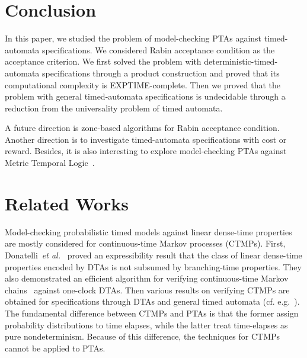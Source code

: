 \section{Conclusion}

In this paper, we studied the problem of model-checking PTAs against timed-automata specifications.
We considered Rabin acceptance condition as the acceptance criterion.
We first solved the problem with deterministic-timed-automata specifications through a product construction and proved that its computational complexity is EXPTIME-complete.
Then we proved that the problem with general timed-automata specifications is undecidable through a reduction from the universality problem of timed automata.

A future direction is zone-based algorithms for Rabin acceptance condition.
Another direction is to investigate timed-automata specifications with cost or reward.
Besides, it is also interesting to explore model-checking PTAs against Metric Temporal Logic~\cite{DBLP:journals/rts/Koymans90}. 

\section{Related Works}

Model-checking probabilistic timed models against linear dense-time properties
are mostly considered for continuous-time Markov processes (CTMPs).
First, Donatelli~\emph{et al.}~\cite{DBLP:journals/tse/DonatelliHS09} proved an expressibility result that the class of linear dense-time properties encoded by DTAs is not subsumed by branching-time properties.
They also demonstrated an efficient algorithm for verifying continuous-time Markov chains~\cite{DBLP:journals/tse/DonatelliHS09} against one-clock DTAs.
Then various results on verifying CTMPs are obtained for specifications through DTAs and general timed automata (cf. e.g.~\cite{DBLP:journals/tse/DonatelliHS09,DBLP:journals/corr/abs-1101-3694,DBLP:conf/hybrid/Fu13,DBLP:conf/hybrid/BrazdilKKKR11,DBLP:conf/tacas/BarbotCHKM11,DBLP:conf/formats/BortolussiL15}).
The fundamental difference between CTMPs and PTAs is that the former assign probability distributions to time elapses, while the latter treat time-elapses as pure nondeterminism.
Because of this difference, the techniques for CTMPs cannot be applied to PTAs.

